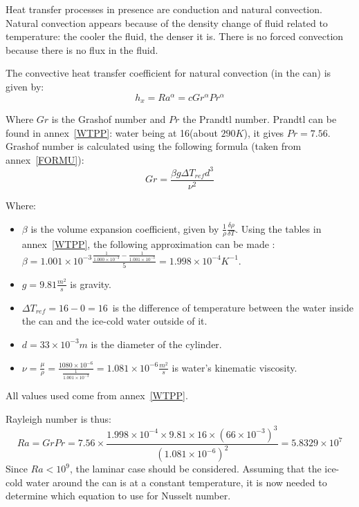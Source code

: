 \documentclass{report}
\begin{document}
	Heat transfer processes in presence are conduction and natural convection. Natural convection appears because of the density change of fluid related to temperature: the cooler the fluid, the denser it is. There is no forced convection because there is no flux in the fluid.
	
	The convective heat transfer coefficient for natural convection (in the can) is given by:
	\begin{equation}
		h_x=Ra^\alpha = cGr^\alpha Pr^\alpha
	\end{equation}
	
	Where $Gr$ is the Grashof number and $Pr$ the Prandtl number. Prandtl can be found in annex~\ref{WTPP}: water being at 16\textcelsius (about $290K$), it gives $Pr=7.56$.\\
	Grashof number is calculated using the following formula (taken from annex~\ref{FORMU}):
	\begin{equation}
	Gr=\frac{\beta g \Delta T_{ref} d^3}{\nu^2}
	\end{equation}
	
	Where:
	\begin{itemize}
		\item $\beta$ is the volume expansion coefficient, given by $\frac{1}{\rho}\frac{\delta\rho}{\delta T}$. Using the tables in annex~\ref{WTPP}, the following approximation can be made : $\beta=1.001\times 10^{-3}\frac{\frac{1}{1.000\times 10^{-3}}-\frac{1}{1.001\times 10^{-3}}}{5}=1.998\times 10^{-4} K^{-1}$.
		\item $g=9.81\frac{m^2}{s}$ is gravity.
		\item $\Delta T_{ref}=16-0=16$\textcelsius\ is the difference of temperature between the water inside the can and the ice-cold water outside of it.
		\item $d=33\times 10^{-3}m$ is the diameter of the cylinder.
		\item $\nu=\frac{\mu}{\rho}=\frac{1080\times 10^{-6}}{\frac{1}{1.001\times 10^{-3}}}=1.081\times 10^{-6}\frac{m^2}{s}$ is water's kinematic viscosity.
	\end{itemize}
	All values used come from annex~\ref{WTPP}.
	
	
	Rayleigh number is thus: 
	\begin{equation}
		Ra = GrPr= 7.56\times \frac{1.998\times 10^{-4}\times 9.81\times 16\times (66\times 10^{-3})^3}{(1.081\times 10^{-6})^2}= 5.8329\times 10^{7}
	\end{equation}
	Since $Ra<10^9$, the laminar case should be considered. Assuming that the ice-cold water around the can is at a constant temperature, it is now needed to determine which equation to use for Nusselt number.
	
\end{document}
